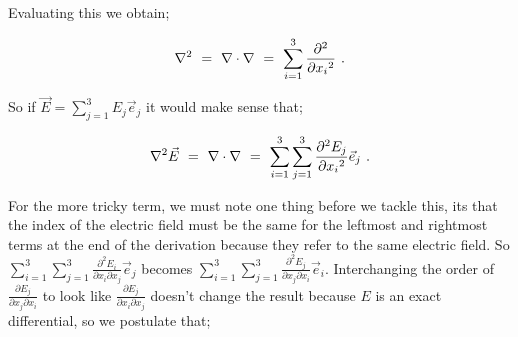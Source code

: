 \documentclass{article}
\begin{document}
Evaluating this we obtain;

\begin{equation} \label{eq:51}
\nabla^{2} \hspace{0.125cm} = \hspace{0.125cm} \nabla\cdot\nabla \hspace{0.125cm} = \hspace{0.125cm} \sum_{i=1}^{3} \frac{\partial^{2}}{\partial{x_i}^{2}} \hspace{0.125cm} .
\end{equation}

So if \begin{math} \vec{E} = \sum_{j=1}^{3} E_j \vec{e}_j \end{math} it would make sense that;

\begin{equation} \label{eq:51}
\nabla^{2}\vec{E} \hspace{0.125cm} = \hspace{0.125cm} \nabla\cdot\nabla \hspace{0.125cm} = \hspace{0.125cm} \sum_{i=1}^{3} \sum_{j=1}^{3} \frac{\partial^{2} E_j}{\partial{x_i}^{2}} \vec{e}_j \hspace{0.125cm} .
\end{equation}

For the more tricky term, we must note one thing before we tackle this, its that the index of the electric field must be the same for the leftmost and rightmost terms at the end of the derivation because they refer to the same electric field. So \begin{math} \sum_{i=1}^{3} \sum_{j=1}^{3} \frac{\partial^{2}{E_i}}{\partial{x_i}\partial{x_j}} \vec{e}_j \end{math} becomes \begin{math} \sum_{i=1}^{3} \sum_{j=1}^{3} \frac{\partial^{2}{E_j}}{\partial{x_j}\partial{x_i}} \vec{e}_i \end{math}. Interchanging the order of \begin{math} \frac{\partial{E_j}}{\partial{x_j}\partial{x_i}} \end{math} to look like \begin{math} \frac{\partial{E_j}}{\partial{x_i}\partial{x_j}} \end{math} doesn't change the result because \begin{math} E \end{math} is an exact differential, so we postulate that;
\end{document}
